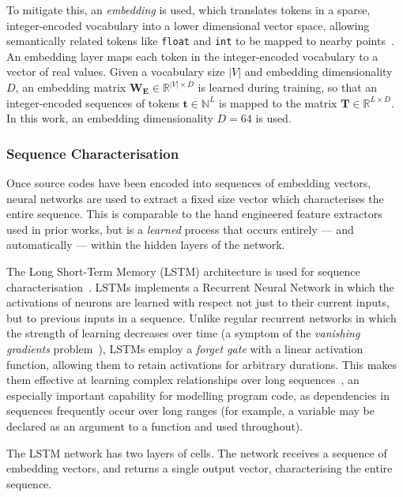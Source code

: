To mitigate this, an \emph{embedding} is used, which translates tokens in a sparse, integer-encoded vocabulary into a lower dimensional vector space, allowing semantically related tokens like \texttt{float} and \texttt{int} to be mapped to nearby points~\cite{Mikolov2013a,Baroni2014}. An embedding layer maps each token in the integer-encoded vocabulary to a vector of real values. Given a vocabulary size $|V|$ and embedding dimensionality $D$, an embedding matrix $\bm{W_{E}} \in \mathbb{R}^{|V| \times D}$ is learned during training, so that an integer-encoded sequences of tokens $\bm{t} \in \mathbb{N}^{L}$ is mapped to the matrix $\bm{T} \in \mathbb{R}^{L \times D}$. In this work, an embedding dimensionality $D = 64$ is used.



\subsubsection{Sequence Characterisation}

Once source codes have been encoded into sequences of embedding vectors, neural networks are used to extract a fixed size vector which characterises the entire sequence. This is comparable to the hand engineered feature extractors used in prior works, but is a \emph{learned} process that occurs entirely --- and automatically --- within the hidden layers of the network.

The Long Short-Term Memory (LSTM) architecture is used for sequence characterisation~\cite{Hochreiter1997}. LSTMs implements a Recurrent Neural Network in which the activations of neurons are learned with respect not just to their current inputs, but to previous inputs in a sequence. Unlike regular recurrent networks in which the strength of learning decreases over time (a symptom of the \emph{vanishing gradients} problem~\cite{Pacanu2013}), LSTMs employ a \emph{forget gate} with a linear activation function, allowing them to retain activations for arbitrary durations. This makes them effective at learning complex relationships over long sequences~\cite{Lipton2015}, an especially important capability for modelling program code, as dependencies in sequences frequently occur over long ranges (for example, a variable may be declared as an argument to a function and used throughout).

The LSTM network has two layers of cells. The network receives a sequence of embedding vectors, and returns a single output vector, characterising the entire sequence.


